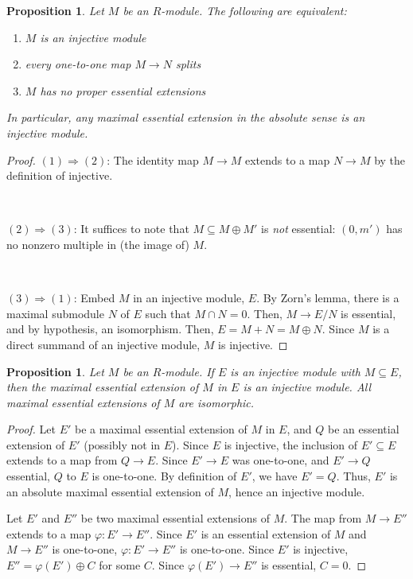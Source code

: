 \documentclass[11pt]{book}
\newtheorem{proposition}[theorem]{Proposition}
\numberwithin{equation}{section}
\numberwithin{theorem}{chapter}
\theoremstyle{definition}
\newtheorem*{basic properties}{Basic Properties}
\newtheorem*{Important Remark}{Important Remark}
\theoremstyle{remark}
\begin{document}
\begin{proposition}
	Let $M$ be an $R$-module. The following are equivalent:
	\begin{enumerate}
		\item $M$ is an injective module
		\item every one-to-one map $M\to N$ splits
		\item $M$ has no proper essential extensions
	\end{enumerate}
In particular, any maximal essential extension in the absolute sense is an injective module.
\end{proposition}
\begin{proof}
	$(1)\Rightarrow (2)$: The identity map $M\to M$ extends to a map $N\to M$ by the definition of injective.
	
	\
	
		$(2)\Rightarrow (3)$: It suffices to note that $M \subseteq M \oplus M'$ is \emph{not} essential: $(0,m')$ has no nonzero multiple in (the image of) $M$.
		
		\
		
		$(3)\Rightarrow (1)$: Embed $M$ in an injective module, $E$. By Zorn's lemma, there is a maximal submodule $N$ of $E$ such that $M\cap N=0$. Then, $M \to E/N$ is essential, and by hypothesis, an isomorphism. Then, $E=M+N=M\oplus N$. Since $M$ is a direct summand of an injective module, $M$ is injective.
\end{proof}

\begin{proposition}
	Let $M$ be an $R$-module. If $E$ is an injective module with $M\subseteq E$, then the maximal essential extension of $M$ in $E$ is an injective module. All maximal essential extensions of $M$ are isomorphic.
\end{proposition}
\begin{proof}
	Let $E'$ be a maximal essential extension of $M$ in $E$, and $Q$ be an essential extension of $E'$ (possibly not in $E$). Since $E$ is injective, the inclusion of $E'\subseteq E$ extends to a map from $Q\to E$. Since $E'\to E$ was one-to-one, and $E' \to Q$ essential, $Q$ to $E$ is one-to-one. By definition of $E'$, we have $E'=Q$. Thus, $E'$ is an absolute maximal essential extension of $M$, hence an injective module.
	
	Let $E'$ and $E''$ be two maximal essential extensions of $M$. The map from $M\to E''$ extends to a map $\varphi:E' \to E''$. Since $E'$ is an essential extension of $M$ and $M \to E''$ is one-to-one, $\varphi:E'\to E''$ is one-to-one. Since $E'$ is injective, $E''=\varphi(E')\oplus C$ for some $C$. Since $\varphi(E')\to E''$ is essential, $C=0$.
\end{proof}
\end{document}
